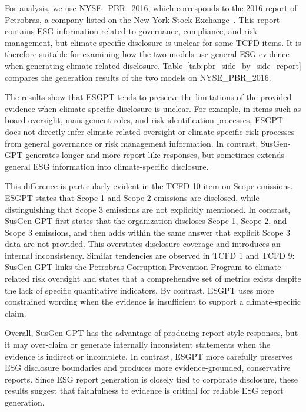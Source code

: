 \documentclass[11pt]{article}
\begin{document}
For analysis, we use NYSE\_PBR\_2016, which corresponds to the 2016 report of Petrobras, a company listed on the New York Stock Exchange~\cite{ni2023chatreport}. This report contains ESG information related to governance, compliance, and risk management, but climate-specific disclosure is unclear for some TCFD items. It is therefore suitable for examining how the two models use general ESG evidence when generating climate-related disclosure. Table~\ref{tab:pbr_side_by_side_report} compares the generation results of the two models on NYSE\_PBR\_2016.

The results show that \textsf{ESGPT} tends to preserve the limitations of the provided evidence when climate-specific disclosure is unclear. For example, in items such as board oversight, management roles, and risk identification processes, \textsf{ESGPT} does not directly infer climate-related oversight or climate-specific risk processes from general governance or risk management information. In contrast, SusGen-GPT generates longer and more report-like responses, but sometimes extends general ESG information into climate-specific disclosure.

This difference is particularly evident in the TCFD 10 item on Scope emissions. \textsf{ESGPT} states that Scope 1 and Scope 2 emissions are disclosed, while distinguishing that Scope 3 emissions are not explicitly mentioned. In contrast, SusGen-GPT first states that the organization discloses Scope 1, Scope 2, and Scope 3 emissions, and then adds within the same answer that explicit Scope 3 data are not provided. This overstates disclosure coverage and introduces an internal inconsistency. Similar tendencies are observed in TCFD 1 and TCFD 9: SusGen-GPT links the Petrobras Corruption Prevention Program to climate-related risk oversight and states that a comprehensive set of metrics exists despite the lack of specific quantitative indicators. By contrast, \textsf{ESGPT} uses more constrained wording when the evidence is insufficient to support a climate-specific claim.

Overall, SusGen-GPT has the advantage of producing report-style responses, but it may over-claim or generate internally inconsistent statements when the evidence is indirect or incomplete. In contrast, \textsf{ESGPT} more carefully preserves ESG disclosure boundaries and produces more evidence-grounded, conservative reports. Since ESG report generation is closely tied to corporate disclosure, these results suggest that faithfulness to evidence is critical for reliable ESG report generation.
\end{document}

